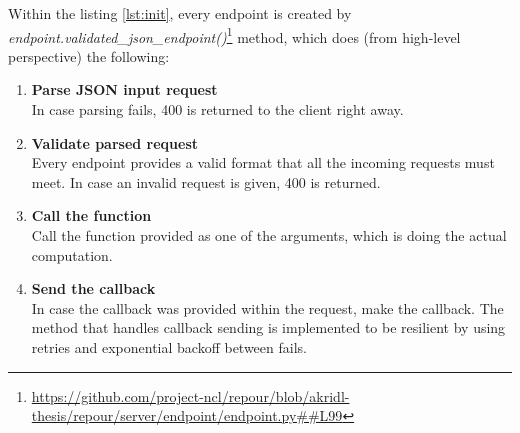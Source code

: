 \documentclass[../main.tex]{subfiles}
\begin{document}
Within the listing \ref{lst:init}, every endpoint is created by\\
\textit{endpoint.validated\_json\_endpoint()}\footnote{\url{https://github.com/project-ncl/repour/blob/akridl-thesis/repour/server/endpoint/endpoint.py##L99}} method, which does (from high-level perspective) the following:

\begin{enumerate}
    \item \textbf{Parse JSON input request}\\
    In case parsing fails, 400 is returned to the client right away.

    \item \textbf{Validate parsed request}\\
    Every endpoint provides a valid format that all the incoming requests must meet. In case an invalid request is given, 400 is returned.

    \item \textbf{Call the function}\\
    Call the function provided as one of the arguments, which is doing the actual computation.

    \item \textbf{Send the callback}\\
    In case the callback was provided within the request, make the callback. The method that handles callback sending is implemented to be resilient by using retries and exponential backoff between fails.

\end{enumerate}
\end{document}
